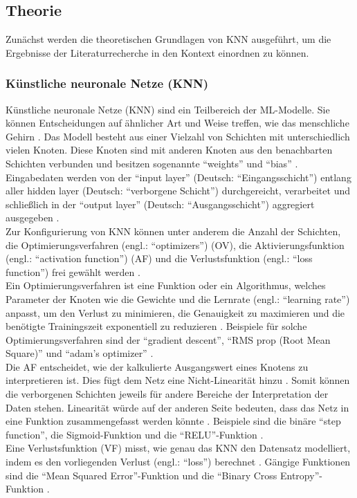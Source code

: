 \documentclass{scrartcl}
\begin{document}
\subsection{Theorie}

Zunächst werden die theoretischen Grundlagen von KNN ausgeführt, um die Ergebnisse
der Literaturrecherche in den Kontext einordnen zu können.

\subsubsection{Künstliche neuronale Netze (KNN)}
Künstliche neuronale Netze (KNN) sind ein Teilbereich der ML-Modelle. Sie können
Entscheidungen auf ähnlicher Art und Weise treffen, wie das menschliche Gehirn \cite{ibm}.
Das Modell besteht aus einer Vielzahl von Schichten mit unterschiedlich vielen
Knoten. Diese Knoten sind mit anderen Knoten aus den benachbarten Schichten verbunden
und besitzen sogenannte \enquote{weights} und \enquote{bias} \cite{ibm}.
Eingabedaten werden von der \enquote{input layer} (Deutsch: \enquote{Eingangsschicht})
entlang aller hidden layer (Deutsch: \enquote{verborgene Schicht}) durchgereicht,
verarbeitet und schließlich in der \enquote{output layer}
(Deutsch: \enquote{Ausgangsschicht}) aggregiert ausgegeben \cite{ibm}.
\medskip \\
Zur Konfigurierung von KNN können unter anderem die Anzahl der Schichten,
die Optimierungsverfahren (engl.: \enquote{optimizers}) (OV), die
Aktivierungsfunktion (engl.: \enquote{activation function}) (AF) und die
Verlustsfunktion (engl.: \enquote{loss function}) frei gewählt werden
\cite{actopt}.
\medskip \\
Ein Optimierungsverfahren ist eine Funktion oder ein Algorithmus, welches
Parameter der Knoten wie die Gewichte und die Lernrate (engl.: \enquote{learning rate})
anpasst, um den Verlust zu minimieren, die Genauigkeit zu maximieren und
die benötigte Trainingszeit exponentiell zu reduzieren \cite{actopt}.
Beispiele für solche Optimierungsverfahren sind der \enquote{gradient descent},
\enquote{RMS prop (Root Mean Square)} und \enquote{adam's optimizer} \cite{actopt}.
\smallskip \\
Die AF entscheidet, wie der kalkulierte Ausgangswert
eines Knotens zu interpretieren ist. Dies fügt dem Netz eine Nicht-Linearität
hinzu \cite{actopt}. Somit können die verborgenen Schichten jeweils für
andere Bereiche der Interpretation der Daten stehen. Linearität würde auf
der anderen Seite bedeuten, dass das Netz in eine Funktion zusammengefasst
werden könnte \cite{actopt}. Beispiele sind die binäre \enquote{step function},
die Sigmoid-Funktion und die \enquote{RELU}-Funktion \cite{actopt}.
\smallskip \\
Eine Verlustsfunktion (VF) misst, wie genau das KNN den Datensatz modelliert, indem
es den vorliegenden Verlust (engl.: \enquote{loss}) berechnet \cite{actopt}.
Gängige Funktionen sind die \enquote{Mean Squared Error}-Funktion und die
\enquote{Binary Cross Entropy}-Funktion \cite{actopt}.
\end{document}
